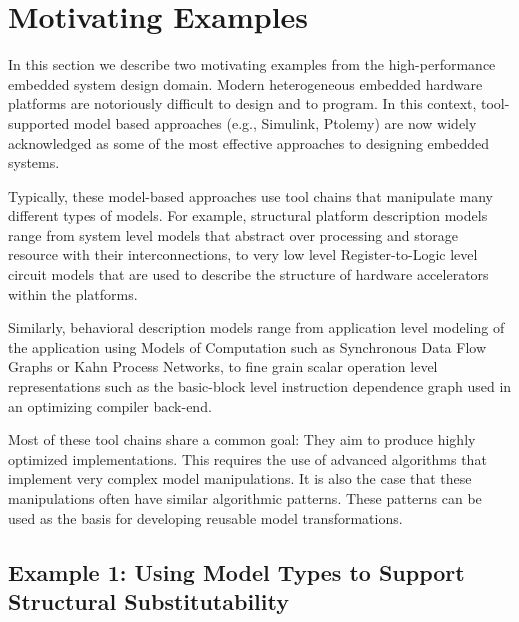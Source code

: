 \section{Motivating Examples}\label{examples}

In this section we describe two motivating examples from the high-performance embedded system design domain. 
Modern heterogeneous embedded hardware platforms are notoriously difficult to design and to program. 
In this context, tool-supported model based approaches (e.g., Simulink, Ptolemy) are now widely acknowledged as some of the most 
effective approaches to designing embedded systems. 

Typically, these model-based approaches use tool chains that manipulate many different types of models. 
For example, structural platform description models range from system level models that abstract over processing and storage resource with their interconnections, to very low level Register-to-Logic level circuit models that are used to describe the structure of hardware accelerators within the platforms.

Similarly, behavioral description models range from application level modeling of the 
application using Models of Computation such as Synchronous Data Flow Graphs or 
Kahn Process Networks, to fine grain scalar operation level representations such as the 
basic-block level instruction dependence graph used in an optimizing compiler back-end. 

Most of these tool chains share a common goal: They aim to produce highly optimized  
implementations. This requires the use of advanced algorithms that implement very complex model manipulations. 
It is also the case that these manipulations often have similar algorithmic patterns. These patterns can be used as the basis for
developing reusable model transformations.


\subsection{Example 1: Using Model Types to Support Structural Substitutability}\label{structuralexample}

